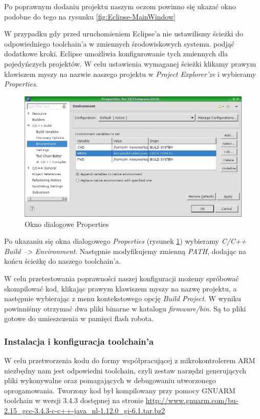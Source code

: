 Po poprawnym dodaniu projektu naszym oczom powinno się ukazać okno podobne do
tego na rysunku \ref{fig:Eclipse-MainWindow}

W przypadku gdy przed uruchomieniem Eclipse'a nie ustawilismy ścieżki do
odpowiedniego toolchain'a w zmiennych środowiskowych systemu. podjąć dodatkowe
kroki. Eclipse umożliwia konfigurowanie tych zmiennych dla pojedyńczych
projektów. W celu ustawienia wymaganej ścieżki klikamy prawym klawiszem myszy na
nazwie naszego projektu w \textit{Project Explorer'ze} i wybieramy
\textit{Properties}.

\begin{figure}
 \centering
 \includegraphics[width=150.0mm]{../images/Eclipse-Project-Properties.jpg}
 \caption{Okno dialogowe Properties}
 \label{fig:Eclipse-Project-Properties}
\end{figure}

Po ukazaniu się okna dialogowego \textit{Properties} (rysunek
\ref{fig:Eclipse-Project-Properties}) wybieramy \textit{C/C++ Build -->
Environment}. Następnie modyfikujemy zmienną \textit{PATH}, dodając na końcu
ścieżkę do naszego toolchain'a.

W celu przetestowania poprawności naszej konfiguracji możemy spróbować
skompilować kod, klikając prawym klawiszem myszy na nazwę projektu, a następnie
wybierając z menu kontekstowego opcję \textit{Build Project}. W wyniku powinniśmy
otrzymać dwa pliki binarne w katalogu \textit{firmware/bin}. Są to pliki gotowe
do umieszczenia w pamięci flash robota.

\subsubsection{Instalacja i konfiguracja toolchain'a}
W celu przetworzenia kodu do formy współpracującej z mikrokontrolerem ARM
niezbędny nam jest odpowiedni toolchain, czyli zestaw narzędzi generujących pliki
wykonywalne oraz pomagających w debugowaniu utworzonego oprogamowania. Tworzony
kod był kompilowany przy pomocy GNUARM toolchain w wersji 3.4.3 dostępnej na
stronie
\url{http://www.gnuarm.com/bu-2.15_gcc-3.4.3-c-c++-java_nl-1.12.0_gi-6.1.tar.bz2}

